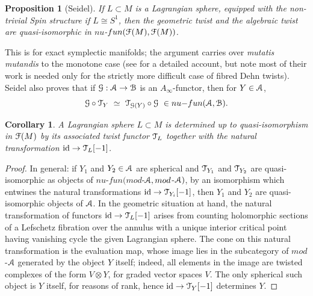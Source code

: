 \documentclass[reqno,10pt]{amsart}
\numberwithin{equation}{section}
\newcommand{\scrG}{\EuScript{G}}
\newcommand{\scrT}{\EuScript{T}}
\newcommand{\scrF}{\EuScript{F}}
\newcommand{\scrA}{\EuScript{A}}
\newcommand{\scrB}{\EuScript{B}}
\newcommand{\id}{\operatorname{id}}
\newtheorem{Corollary}[thm]{Corollary}
\newtheorem{Proposition}[thm]{Proposition}
\theoremstyle{remark}
\begin{document}
\begin{Proposition}[Seidel] \label{Prop:twists}
If $L\subset M$ is a Lagrangian sphere, equipped with the non-trivial \emph{Spin} structure if $L \cong S^1$, then the geometric twist and the algebraic twist are quasi-isomorphic in $nu$-$fun(\scrF(M),\scrF(M))$.
\end{Proposition}

This is \cite[Corollary 17.17]{FCPLT} for exact symplectic manifolds; the argument carries over \emph{mutatis mutandis} to the monotone case (see \cite{WW:triangle} for a detailed account, but note most of their work is needed only for the strictly more difficult case of fibred Dehn twists).  Seidel also proves that if $\scrG: \scrA \rightarrow \scrB$ is an $A_{\infty}$-functor, then for $Y\in \scrA$,
\begin{equation} \label{Eqn:TwistFunctor}
\scrG \circ \scrT_Y \ \simeq \ \scrT_{\scrG(Y)}\circ \scrG \ \in nu{\--}fun(\scrA,\scrB).
\end{equation}

\begin{Corollary}\label{Cor:TwistDeterminesSphere}
A Lagrangian sphere $L \subset M$ is  determined up to quasi-isomorphism in $\scrF(M)$ by its associated twist functor $\scrT_L$ together with the natural transformation $\id \rightarrow \scrT_L[-1]$. 
\end{Corollary}
 
 \begin{proof}
 In general:  if $Y_1$ and $Y_2 \in \scrA$ are spherical and $\scrT_{Y_1}$ and $\scrT_{Y_2}$ are quasi-isomorphic as objects of $nu$-$fun(mod$-$\scrA,mod$-$\scrA)$, by an isomorphism which entwines the natural transformations $\id \rightarrow \scrT_{Y_i}[-1]$, then $Y_1$ and $Y_2$ are quasi-isomorphic objects of $\scrA$.   In the geometric situation at hand, the natural transformation of functors $\id \rightarrow \scrT_L[-1]$ arises from counting holomorphic sections of a Lefschetz fibration over the annulus with a unique interior critical point having vanishing cycle the given Lagrangian sphere.  The cone on this natural transformation is the evaluation map, whose image lies in the subcategory of $mod$-$\scrA$ generated by the object $Y$ itself; indeed, all elements in the image are twisted complexes of the form $V\otimes Y$, for graded vector spaces $V$.  The only spherical such object is $Y$ itself, for reasons of rank, hence $\id \rightarrow \scrT_Y[-1]$ determines $Y$.  \end{proof}
\end{document}
